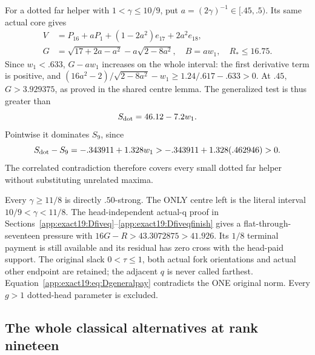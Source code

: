 \documentclass[11pt]{article}
\theoremstyle{definition}
\theoremstyle{remark}
\begin{document}
For a dotted far helper with \(1<\gamma\le10/9\), put
\(a=(2\gamma)^{-1}\in[.45,.5)\).
Its same actual core gives
\[
\begin{split}
 V&=P_{16}+aP_1+(1-2a^2)e_{17}+2a^2e_{18},\\
 G&=\sqrt{17+2a-a^2}-a\sqrt{2-8a^2},\quad B=aw_1,\quad R_*\le16.75 .
\end{split}
\]
Since \(w_1<.633\), \(G-aw_1\) increases on the whole interval:
the first derivative term is positive, and
\((16a^2-2)/\sqrt{2-8a^2}-w_1\ge1.24/.617-.633>0\).
At \(.45\), \(G>3.929375\), as proved in the shared centre lemma.
The generalized test is thus greater than
\[
                                S_{\rm dot}=46.12-7.2w_1 .
\]
Pointwise it dominates \(S_9\), since
\[
 S_{\rm dot}-S_9=-.343911+1.328w_1
                              >-.343911+1.328(.462946)>0 .
\]
The correlated contradiction therefore covers every small dotted far
helper without substituting unrelated maxima.

Every \(\gamma\ge11/8\) is directly \(.50\)-strong.
The ONLY centre left is the literal interval \(10/9<\gamma<11/8\).
The head-independent actual-q proof in
Sections~\ref{app:exact19:Dfiveq}--\ref{app:exact19:Dfiveqfinish}
gives a flat-through-seventeen pressure with
\(16G-R>43.3072875>41.926\).
Its \(1/8\) terminal payment is still available and its residual has
zero cross with the head-paid support.
The original slack \(0<\tau\le1\), both actual fork orientations and
actual other endpoint are retained; the adjacent \(q\) is never called
farthest.
Equation~\eqref{app:exact19:eq:Dgeneralpay} contradicts the ONE original
norm. Every \(g>1\) dotted-head parameter is excluded.

\subsection{The whole classical alternatives at rank nineteen}
\label{app:exact19:wholeclassicalconclusion}
\end{document}

